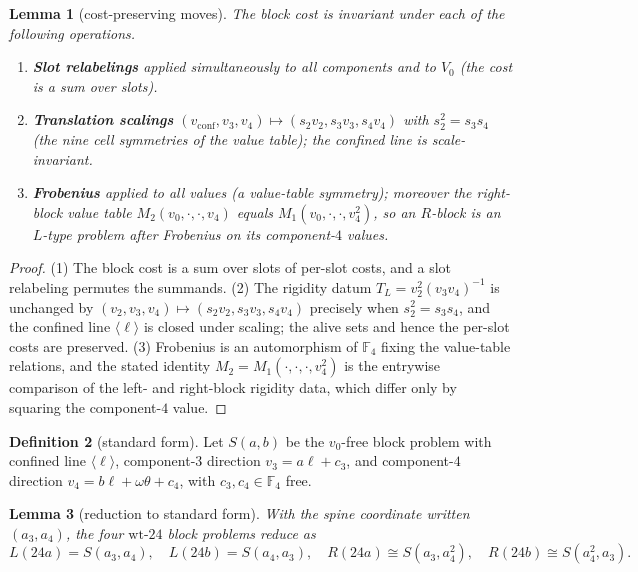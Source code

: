 \documentclass[11pt]{article}
\newcommand{\F}[1]{\mathbb{F}_{#1}}
\newcommand{\slab}{\ell}                          %
\theoremstyle{plain}
\newtheorem{lemma}{Lemma}[section]
\theoremstyle{definition}
\newtheorem{definition}[lemma]{Definition}
\theoremstyle{remark}
\begin{document}
\begin{lemma}[cost-preserving moves]
The block cost is invariant under each of the following operations.
\begin{enumerate}
\item \textbf{Slot relabelings} applied simultaneously to all components and to
  $V_0$ (the cost is a sum over slots).
\item \textbf{Translation scalings}
  $(v_{\mathrm{conf}},v_3,v_4)\mapsto(s_2 v_2,s_3 v_3,s_4 v_4)$ with
  $s_2^2=s_3 s_4$ (the nine cell symmetries of the value table); the confined
  line is scale-invariant.
\item \textbf{Frobenius} applied to all values (a value-table symmetry);
  moreover the right-block value table $M_2(v_0,\cdot,\cdot,v_4)$ equals
  $M_1(v_0,\cdot,\cdot,v_4^2)$, so an $R$-block is an $L$-type problem after
  Frobenius on its component-$4$ values.
\end{enumerate}
\end{lemma}

\begin{proof}
(1) The block cost is a sum over slots of per-slot costs, and a slot relabeling
permutes the summands. (2) The rigidity datum $T_L=v_2^2(v_3v_4)^{-1}$ is
unchanged by $(v_2,v_3,v_4)\mapsto(s_2 v_2,s_3 v_3,s_4 v_4)$ precisely when
$s_2^2=s_3 s_4$, and the confined line $\langle\slab\rangle$ is closed under
scaling; the alive sets and hence the per-slot costs are preserved. (3) Frobenius
is an automorphism of $\F4$ fixing the value-table relations, and the stated
identity $M_2=M_1(\cdot,\cdot,\cdot,v_4^2)$ is the entrywise comparison of the
left- and right-block rigidity data, which differ only by squaring the
component-$4$ value.
\end{proof}

\begin{definition}[standard form]
Let $S(a,b)$ be the $v_0$-free block problem with confined line
$\langle\slab\rangle$, component-$3$ direction $v_3=a\slab+c_3$, and
component-$4$ direction $v_4=b\slab+\omega\theta+c_4$, with $c_3,c_4\in\F4$ free.
\end{definition}

\begin{lemma}[reduction to standard form]\label{lem:stdform}
With the spine coordinate written $(a_3,a_4)$, the four $\text{wt-}24$ block
problems reduce as
\[
  L(24a)=S(a_3,a_4),\quad L(24b)=S(a_4,a_3),\quad
  R(24a)\cong S(a_3,a_4^2),\quad R(24b)\cong S(a_4^2,a_3).
\]
\end{lemma}
\end{document}
